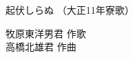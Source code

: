 \documentclass[10pt,b5j]{tarticle} %
\begin{document}
\begin{minipage}[c]{0.7\hsize} %
    \begin{center}
        {\LARGE
            起伏しらぬ %
        }
        {\small 
            （大正11年寮歌） %
        }
    \end{center}
\end{minipage}
\begin{minipage}[c]{0.3\hsize} %
    \begin{flushright} %
        牧原東洋男君 作歌\\高橋北雄君 作曲 %
    \end{flushright}
\end{minipage}
\end{document}
